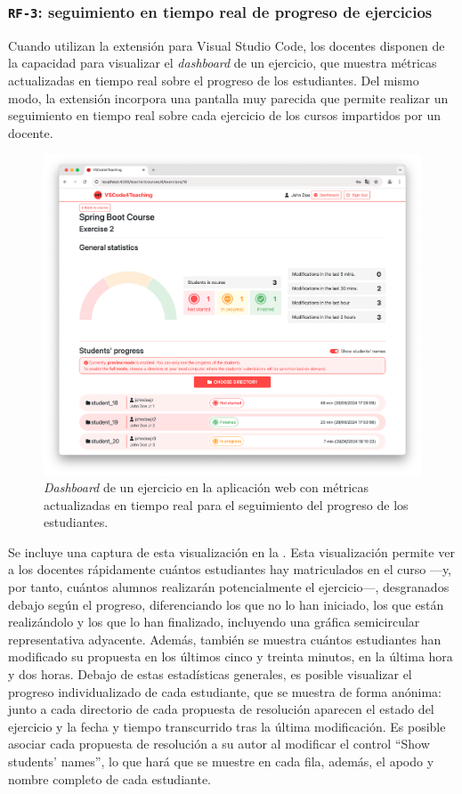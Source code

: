 \subsubsection{\texttt{RF-3}: seguimiento en tiempo real de progreso de ejercicios}
\label{subsec:rf3}

Cuando utilizan la extensión para Visual Studio Code, los docentes disponen de la capacidad para visualizar el \textit{dashboard} de un ejercicio, que muestra métricas actualizadas en tiempo real sobre el progreso de los estudiantes. Del mismo modo, la extensión incorpora una pantalla muy parecida que permite realizar un seguimiento en tiempo real sobre cada ejercicio de los cursos impartidos por un docente.

\begin{figure}[ht]
    \centering
    \includegraphics[width=\textwidth]{imagenes/utilizadas/4-3-implementacion/rf3-1.png}
    \caption{\textit{Dashboard} de un ejercicio en la aplicación web con métricas actualizadas en tiempo real para el seguimiento del progreso de los estudiantes.}
    \label{fig:reqf3-1}
\end{figure}

Se incluye una captura de esta visualización en la . Esta visualización permite ver a los docentes rápidamente cuántos estudiantes hay matriculados en el curso ---y, por tanto, cuántos alumnos realizarán potencialmente el ejercicio---, desgranados debajo según el progreso, diferenciando los que no lo han iniciado, los que están realizándolo y los que lo han finalizado, incluyendo una gráfica semicircular representativa adyacente. Además, también se muestra cuántos estudiantes han modificado su propuesta en los últimos cinco y treinta minutos, en la última hora y dos horas. Debajo de estas estadísticas generales, es posible visualizar el progreso individualizado de cada estudiante, que se muestra de forma anónima: junto a cada directorio de cada propuesta de resolución aparecen el estado del ejercicio y la fecha y tiempo transcurrido tras la última modificación. Es posible asociar cada propuesta de resolución a su autor al modificar el control ``Show students' names'', lo que hará que se muestre en cada fila, además, el apodo y nombre completo de cada estudiante.

